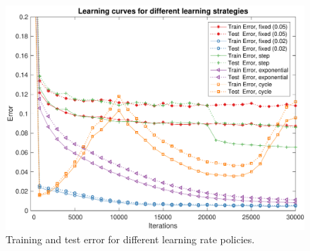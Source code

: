 \begin{figure}
	\centering
	\includegraphics[width=\columnwidth]{figures/error_strategies.pdf}
	\caption{Training and test error for different learning rate policies.}
	\label{fig:lrp_training_error}
\end{figure}
